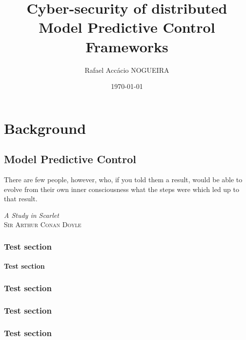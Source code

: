 \documentclass[ornaments]{these-dbl}
\author{Rafael Accácio NOGUEIRA}
\title{Cyber-security of distributed Model Predictive Control Frameworks}
\date{\today}
\begin{document}
\dominitoc

\maketitle
{}

\frontmatter
% 

\tableofcontents

% 

\listofacronyms
\listoffigures
\listoftables
\printglossary




\mainmatter

% 


\part{Background}
\minitoc
\chapter{Model Predictive Control}
\epigraph{\centering There are few people, however, who, if you told them a result, would be able to evolve from their own inner consciousness what the steps were which led up to that result.}
{\textit{A Study in Scarlet}\\ \textsc{Sir Arthur Conan Doyle}}
\minitoc

\section{Test section}

\subsection{Test section}
\section{Test section}
\section{Test section}
\section{Test section}
\end{document}

